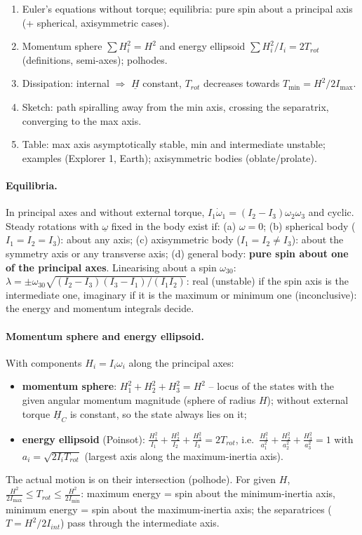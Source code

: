 \begin{outline}
\begin{enumerate}
\item Euler's equations without torque; equilibria: pure spin about a principal axis (+ spherical, axisymmetric cases).
\item Momentum sphere $\sum H_i^2=H^2$ and energy ellipsoid $\sum H_i^2/I_i=2T_{rot}$ (definitions, semi-axes); polhodes.
\item Dissipation: internal $\Rightarrow$ $\underline H$ constant, $T_{rot}$ decreases towards $T_{\min}=H^2/2I_{\max}$.
\item Sketch: path spiralling away from the min axis, crossing the separatrix, converging to the max axis.
\item Table: max axis asymptotically stable, min and intermediate unstable; examples (Explorer 1, Earth); axisymmetric bodies (oblate/prolate).
\end{enumerate}
\end{outline}

\answer
\paragraph{Equilibria.} In principal axes and without external torque, $I_1\dot\omega_1=(I_2-I_3)\omega_2\omega_3$ and cyclic. Steady rotations
with $\underline\omega$ fixed in the body exist if: (a) $\omega=0$; (b) spherical body ($I_1=I_2=I_3$): about any axis; (c) axisymmetric
body ($I_1=I_2\neq I_3$): about the symmetry axis or any transverse axis; (d) general body: \textbf{pure spin about one of the principal axes}.
Linearising about a spin $\omega_{30}$: $\lambda=\pm\omega_{30}\sqrt{(I_2-I_3)(I_3-I_1)/(I_1I_2)}$: real (unstable) if the spin axis is the
intermediate one, imaginary if it is the maximum or minimum one (inconclusive): the energy and momentum integrals decide.

\paragraph{Momentum sphere and energy ellipsoid.} With components $H_i=I_i\omega_i$ along the principal axes:
\begin{itemize}
\item \textbf{momentum sphere}: $H_1^2+H_2^2+H_3^2=H^2$ -- locus of the states with the given angular momentum magnitude (sphere of radius $H$);
without external torque $\underline H_C$ is constant, so the state always lies on it;
\item \textbf{energy ellipsoid} (Poinsot): $\frac{H_1^2}{I_1}+\frac{H_2^2}{I_2}+\frac{H_3^2}{I_3}=2T_{rot}$, i.e.\
$\frac{H_1^2}{a_1^2}+\frac{H_2^2}{a_2^2}+\frac{H_3^2}{a_3^2}=1$ with $a_i=\sqrt{2I_iT_{rot}}$ (largest axis along the maximum-inertia axis).
\end{itemize}
The actual motion is on their intersection (polhode). For given $H$, $\frac{H^2}{2I_{\max}}\le T_{rot}\le\frac{H^2}{2I_{\min}}$: maximum energy
= spin about the minimum-inertia axis, minimum energy = spin about the maximum-inertia axis; the separatrices ($T=H^2/2I_{int}$) pass
through the intermediate axis.

